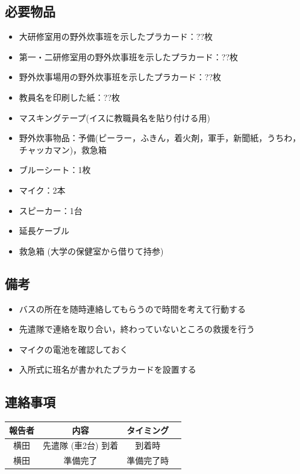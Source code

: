 \subsection{必要物品}
\begin{itemize}
\item 大研修室用の野外炊事班を示したプラカード：??枚
\item 第一・二研修室用の野外炊事班を示したプラカード：??枚
\item 野外炊事場用の野外炊事班を示したプラカード：??枚
\item 教員名を印刷した紙：??枚
\item マスキングテープ(イスに教職員名を貼り付ける用)
\item 野外炊事物品：予備(ピーラー，ふきん，着火剤，軍手，新聞紙，うちわ，チャッカマン)，救急箱
\item ブルーシート：1枚
\item マイク：2本
\item スピーカー：1台
\item 延長ケーブル
\item 救急箱 (大学の保健室から借りて持参)
\end{itemize}


\subsection{備考}
\begin{itemize}
\item バスの所在を随時連絡してもらうので時間を考えて行動する
\item 先遣隊で連絡を取り合い，終わっていないところの救援を行う
\item マイクの電池を確認しておく
\item 入所式に班名が書かれたプラカードを設置する
\end{itemize}


\subsection{連絡事項}
\begin{table}[h]
\begin{tabular}{|c|c|c|c|}
\hline
報告者 & 内容 & タイミング \\ \hline \hline
横田 & 先遣隊 (車2台) 到着 & 到着時\\ \hline
横田 & 準備完了 & 準備完了時 \\ \hline
\end{tabular}
\end{table}

%

